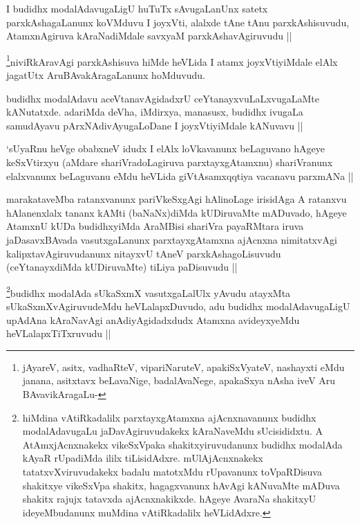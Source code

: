 \begin{artha}
I budidhx modalAdavugaLigU huTuTx sAvugaLanUnx satetx parxkAshagaLanunx koVMduvu I joyxVti, alalxde tAne tAnu parxkAshisuvudu, AtamxnAgiruva kAraNadiMdale savxyaM parxkAshavAgiruvudu ||
\end{artha}

\begin{artha}
\footnote{jAyareV, asitx, vadhaRteV, vipariNaruteV, apakiSxVyateV, nashayxti eMdu janana, asitxtavx beLavaNige, badalAvaNege, apakaSxya nAsha iveV Aru BAvavikAragaLu-}niviRkAravAgi parxkAshisuva hiMde heVLida I atamx joyxVtiyiMdale elAlx jagatUtx AruBAvakAragaLanunx hoMduvudu.
\end{artha}

\begin{artha}
budidhx modalAdavu aceVtanavAgidadxrU ceYtanayxvuLaLxvugaLaMte kANutatxde. adariMda deVha, iMdirxya, manasusx, budidhx ivugaLa samudAyavu pArxNAdivAyugaLoDane I joyxVtiyiMdale kANuvavu ||
\end{artha}

\begin{artha}
`sUyaRnu heVge obabxneV idudx I elAlx loVkavanunx beLaguvano hAgeye keSxVtirxyu (aMdare shariVradoLagiruva parxtayxgAtamxnu) shariVranunx elalxvanunx beLaguvanu eMdu heVLida giVtAsamxqqtiya vacanavu parxmANa ||
\end{artha}

\begin{artha}
marakataveMba ratanxvanunx pariVkeSxgAgi hAlinoLage irisidAga A ratanxvu hAlanenxlalx tananx kAMti (baNaNx)diMda kUDiruvaMte mADuvado, hAgeye AtamxnU kUDa budidhxyiMda AraMBisi shariVra payaRMtara iruva jaDasavxBAvada vasutxgaLanunx parxtayxgAtamxna ajAcnxna nimitatxvAgi kalipxtavAgiruvudanunx nitayxvU tAneV parxkAshagoLisuvudu (ceYtanayxdiMda kUDiruvaMte) tiLiya paDisuvudu ||
\end{artha}

\begin{artha}
\footnote{hiMdina vAtiRkadalilx parxtayxgAtamxna ajAcnxnavanunx budidhx modalAdavugaLu jaDavAgiruvudakekx kAraNaveMdu sUcisididxtu. A AtAmxjAcnxnakekx vikeSxVpaka shakitxyiruvudanunx budidhx modalAda kAyaR rUpadiMda ililx tiLisidAdxre. mUlAjAcnxnakekx tatatxvXviruvudakekx badalu matotxMdu rUpavanunx toVpaRDisuva shakitxye vikeSxVpa shakitx, hagagxvanunx hAvAgi kANuvaMte mADuva shakitx rajujx tatavxda ajAcnxnakikxde. hAgeye AvaraNa shakitxyU ideyeMbudanunx muMdina vAtiRkadalilx heVLidAdxre.}budidhx modalAda sUkaSxmX vasutxgaLalUlx yAvudu atayxMta sUkaSxmXvAgiruvudeMdu heVLalapxDuvudo, adu budidhx modalAdavugaLigU upAdAna kAraNavAgi anAdiyAgidadxdudx Atamxna avideyxyeMdu heVLalapxTiTxruvudu ||
\end{artha}

